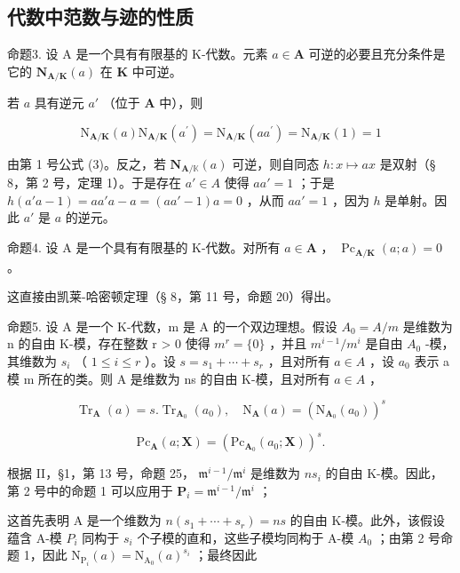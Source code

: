 \subsection{代数中范数与迹的性质}

命题3. 设 A 是一个具有有限基的 K-代数。元素 \(a \in \mathbf{A}\) 可逆的必要且充分条件是它的 \(\mathbf{N}_{\mathbf{A} / \mathbf{K}}(a)\) 在 \(\mathbf{K}\) 中可逆。

若 \(a\) 具有逆元 \(a'\) （位于 \(\mathbf{A}\) 中），则

\[
\mathrm{N} _ {\mathbf {A} / \mathbf {K}} (a) \mathrm{N} _ {\mathbf {A} / \mathbf {K}} (a ^ {\prime}) = \mathrm{N} _ {\mathbf {A} / \mathbf {K}} (a a ^ {\prime}) = \mathrm{N} _ {\mathbf {A} / \mathbf {K}} (1) = 1
\]

由第 1 号公式 (3)。反之，若 \(\mathbf{N}_{\mathbf{A} / \mathbb{K}}(a)\) 可逆，则自同态 \(h: x \mapsto ax\) 是双射（§ 8，第 2 号，定理 1）。于是存在 \(a' \in A\) 使得 \(aa' = 1\) ；于是 \(h(a'a - 1) = aa'a - a = (aa' - 1)a = 0\) ，从而 \(aa' = 1\) ，因为 \(h\) 是单射。因此 \(a'\) 是 \(a\) 的逆元。

命题4. 设 A 是一个具有有限基的 K-代数。对所有 \(a \in \mathbf{A}\) ， \(\operatorname{Pc}_{\mathbf{A} / \mathbf{K}}(a; a) = 0\) 。

这直接由凯莱-哈密顿定理（§ 8，第 11 号，命题 20）得出。

命题5. 设 A 是一个 K-代数，m 是 A 的一个双边理想。假设 \(A_{0} = A/m\) 是维数为 n 的自由 K-模，存在整数 r \textgreater{} 0 使得 \(m^{r} = \{0\}\) ，并且 \(m^{i-1}/m^{i}\) 是自由 \(A_{0}\) -模，其维数为 \(s_{i}\) （ \(1 \leqslant i \leqslant r\) ）。设 \(s = s_{1} + \cdots + s_{r}\) ，且对所有 \(a \in A\) ，设 \(a_{0}\) 表示 a 模 m 所在的类。则 A 是维数为 ns 的自由 K-模，且对所有 \(a \in A\) ，

\[
\operatorname{Tr} _ {\mathbf {A}} (a) = s. \operatorname{Tr} _ {\mathbf {A} _ {0}} (a _ {0}), \quad \mathrm{N} _ {\mathbf {A}} (a) = (\mathrm{N} _ {\mathbf {A} _ {0}} (a _ {0})) ^ {s}\tag{23}
\]

\[
\mathrm{Pc} _ {\mathbf {A}} (a; \mathbf {X}) = (\mathrm{Pc} _ {\mathbf {A} _ {0}} (a _ {0}; \mathbf {X})) ^ {s}.
\]

根据 II，§1，第 13 号，命题 25， \(\mathfrak{m}^{i - 1} / \mathfrak{m}^{i}\) 是维数为 \(ns_i\) 的自由 K-模。因此，第 2 号中的命题 1 可以应用于 \(\mathbf{P}_i = \mathfrak{m}^{i - 1} / \mathfrak{m}^{i}\) ；

这首先表明 A 是一个维数为 \(n(s_{1} + \cdots + s_{r}) = ns\) 的自由 K-模。此外，该假设蕴含 A-模 \(P_{i}\) 同构于 \(s_{i}\) 个子模的直和，这些子模均同构于 A-模 \(A_{0}\) ；由第 2 号命题 1，因此 \(\mathrm{N}_{\mathrm{P}_{i}}(a) = \mathrm{N}_{\mathrm{A}_{0}}(a)^{s_{i}}\) ；最终因此

